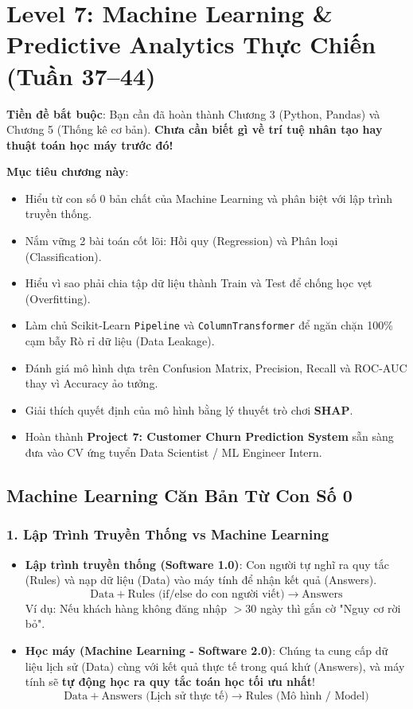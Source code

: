\chapter{Level 7: Machine Learning \& Predictive Analytics Thực Chiến (Tuần 37--44)}

\begin{lythuyetbox}
\textbf{Tiền đề bắt buộc}: Bạn cần đã hoàn thành Chương 3 (Python, Pandas) và Chương 5 (Thống kê cơ bản). \textbf{Chưa cần biết gì về trí tuệ nhân tạo hay thuật toán học máy trước đó!}

\textbf{Mục tiêu chương này}:
\begin{itemize}
    \item Hiểu từ con số 0 bản chất của Machine Learning và phân biệt với lập trình truyền thống.
    \item Nắm vững 2 bài toán cốt lõi: Hồi quy (Regression) và Phân loại (Classification).
    \item Hiểu vì sao phải chia tập dữ liệu thành Train và Test để chống học vẹt (Overfitting).
    \item Làm chủ Scikit-Learn \texttt{Pipeline} và \texttt{ColumnTransformer} để ngăn chặn 100\% cạm bẫy Rò rỉ dữ liệu (Data Leakage).
    \item Đánh giá mô hình dựa trên Confusion Matrix, Precision, Recall và ROC-AUC thay vì Accuracy ảo tưởng.
    \item Giải thích quyết định của mô hình bằng lý thuyết trò chơi \textbf{SHAP}.
    \item Hoàn thành \textbf{Project 7: Customer Churn Prediction System} sẵn sàng đưa vào CV ứng tuyển Data Scientist / ML Engineer Intern.
\end{itemize}
\end{lythuyetbox}

\section{Machine Learning Căn Bản Từ Con Số 0}

\subsection{1. Lập Trình Truyền Thống vs Machine Learning}
\begin{itemize}
    \item \textbf{Lập trình truyền thống (Software 1.0)}: Con người tự nghĩ ra quy tắc (Rules) và nạp dữ liệu (Data) vào máy tính để nhận kết quả (Answers).
    \[
    \text{Data} + \text{Rules (if/else do con người viết)} \longrightarrow \text{Answers}
    \]
    Ví dụ: Nếu khách hàng không đăng nhập $>30$ ngày thì gắn cờ "Nguy cơ rời bỏ".
    \item \textbf{Học máy (Machine Learning - Software 2.0)}: Chúng ta cung cấp dữ liệu lịch sử (Data) cùng với kết quả thực tế trong quá khứ (Answers), và máy tính sẽ \textbf{tự động học ra quy tắc toán học tối ưu nhất}!
    \[
    \text{Data} + \text{Answers (Lịch sử thực tế)} \longrightarrow \text{Rules (Mô hình / Model)}
    \]
\end{itemize}

